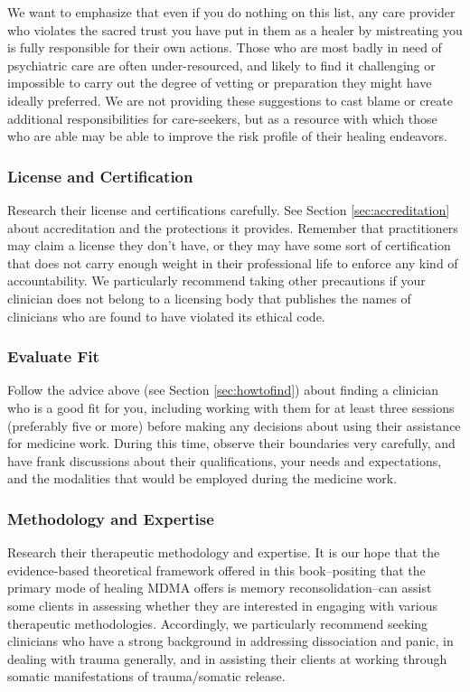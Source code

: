 \documentclass[12pt,letterpaper]{book}
\begin{document}
We want to emphasize that even if you do nothing on this list, any care provider who violates the sacred trust you have put in them as a healer by mistreating you is fully responsible for their own actions. Those who are most badly in need of psychiatric care are often under-resourced, and likely to find it challenging or impossible to carry out the degree of vetting or preparation they might have ideally preferred. We are not providing these suggestions to cast blame or create additional responsibilities for care-seekers, but as a resource with which those who are able may be able to improve the risk profile of their healing endeavors.

\subsubsection*{License and Certification}
Research their license and certifications carefully. See Section \ref{sec:accreditation} about accreditation and the protections it provides. Remember that practitioners may claim a license they don't have, or they may have some sort of certification that does not carry enough weight in their professional life to enforce any kind of accountability. We particularly recommend taking other precautions if your clinician does not belong to a licensing body that publishes the names of clinicians who are found to have violated its ethical code.

\subsubsection*{Evaluate Fit}
Follow the advice above (see Section \ref{sec:howtofind}) about finding a clinician who is a good fit for you, including working with them for at least three sessions (preferably five or more) before making any decisions about using their assistance for medicine work. During this time, observe their boundaries very carefully, and have frank discussions about their qualifications, your needs and expectations, and the modalities that would be employed during the medicine work.

\subsubsection*{Methodology and Expertise}
Research their therapeutic methodology and expertise.  It is our hope that the evidence-based theoretical framework offered in this book–positing that the primary mode of healing MDMA offers is memory reconsolidation–can assist some clients in assessing whether they are interested in engaging with various therapeutic methodologies. Accordingly, we particularly recommend seeking clinicians who have a strong background in addressing dissociation and panic, in dealing with trauma generally, and in assisting their clients at working through somatic manifestations of trauma/somatic release.
\end{document}
